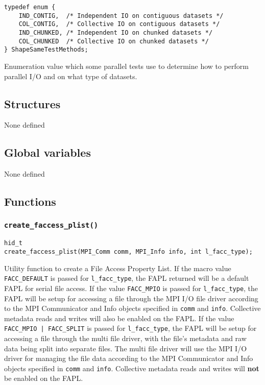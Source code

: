 \documentclass[../HDF5_RFC.tex]{subfiles}
\begin{document}
\begin{verbatim}
typedef enum {
    IND_CONTIG,  /* Independent IO on contiguous datasets */
    COL_CONTIG,  /* Collective IO on contiguous datasets */
    IND_CHUNKED, /* Independent IO on chunked datasets */
    COL_CHUNKED  /* Collective IO on chunked datasets */
} ShapeSameTestMethods;
\end{verbatim}

Enumeration value which some parallel tests use to determine how to perform parallel I/O
and on what type of datasets.

\subsection{Structures}

None defined

\subsection{Global variables}

None defined

\subsection{Functions}

\subsubsection{\texttt{create\_faccess\_plist()}}

\begin{verbatim}
hid_t
create_faccess_plist(MPI_Comm comm, MPI_Info info, int l_facc_type);
\end{verbatim}

Utility function to create a File Access Property List. If the macro value \texttt{FACC\_DEFAULT} is
passed for \texttt{l\_facc\_type}, the FAPL returned will be a default FAPL for serial file access. If
the value \texttt{FACC\_MPIO} is passed for \texttt{l\_facc\_type}, the FAPL will be setup for accessing
a file through the MPI I/O file driver according to the MPI Communicator and Info objects specified in \texttt{comm} and \texttt{info}. Collective metadata reads and writes will also be enabled on the FAPL.
If the value \texttt{FACC\_MPIO | FACC\_SPLIT} is passed for \texttt{l\_facc\_type}, the FAPL will be
setup for accessing a file through the multi file driver, with the file's metadata and raw data being
split into separate files. The multi file driver will use the MPI I/O driver for managing the file data
according to the MPI Communicator and Info objects specified in \texttt{comm} and \texttt{info}.
Collective metadata reads and writes will \textbf{not} be enabled on the FAPL.
\end{document}
